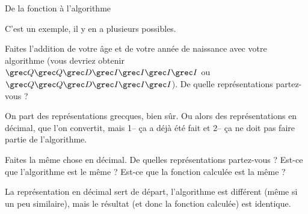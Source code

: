 \begin{exercice}
\begin{exercicelet}{De la fonction à l'algorithme}
\begin{questions}
\begin{xcorrection}
        C'est un exemple, il y en a plusieurs possibles.\end{xcorrection}
    \item Faites l'addition de votre âge et de votre année de naissance
      avec votre algorithme (vous devriez obtenir
      $\Chi\Chi\Delta\Iota\Iota\Iota\Iota$ ou $\Chi\Chi\Delta\Iota\Iota\Iota$). De
      quelle représentations partez-vous ?
      \begin{correction}On part des représentations grecques, bien
        sûr. Ou alors des représentations en décimal, que l'on
        convertit, mais 1-- ça a déjà été fait et 2-- ça ne doit pas
        faire partie de l'algorithme.\end{correction}
    \item Faites la même chose en décimal. De quelles représentations
      partez-vous ? Est-ce que l'algorithme est le même ? Est-ce que
      la fonction calculée est la même ?
      \begin{xcorrection} La représentation en décimal sert de départ,
        l'algorithme est différent (même si un peu similaire), mais le résultat
        (et donc la fonction calculée) est identique.
      \end{xcorrection}
    \end{questions}
  \end{exercicelet}
\end{exercice}
